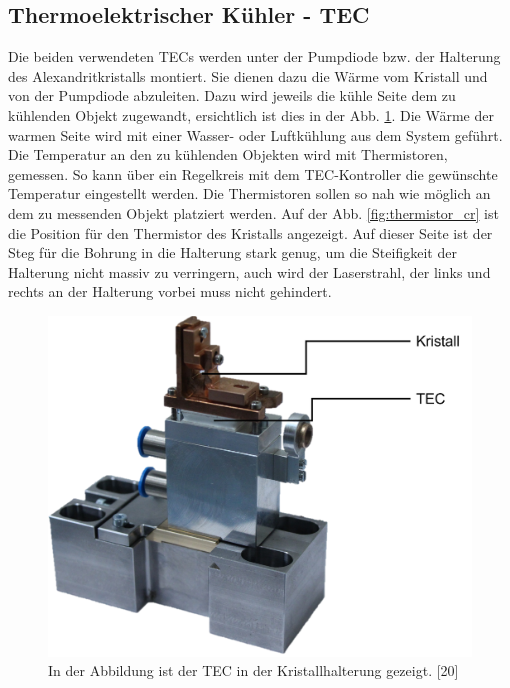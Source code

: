 \subsection{Thermoelektrischer Kühler - TEC}
Die beiden verwendeten TECs werden unter der Pumpdiode bzw. der Halterung des Alexandritkristalls montiert. Sie dienen dazu die Wärme vom Kristall und von der Pumpdiode abzuleiten. Dazu wird jeweils die kühle Seite dem zu kühlenden Objekt zugewandt, ersichtlich ist dies in der Abb. \ref{fig:tec_cr_hw}. Die Wärme der warmen Seite wird mit einer Wasser- oder Luftkühlung aus dem System geführt. Die Temperatur an den zu kühlenden Objekten wird mit Thermistoren, gemessen. So kann über ein Regelkreis mit dem TEC-Kontroller die gewünschte Temperatur eingestellt werden. Die Thermistoren sollen so nah wie möglich an dem zu messenden Objekt platziert werden. Auf der Abb. \ref{fig:thermistor_cr} ist die Position für den Thermistor des Kristalls angezeigt. Auf dieser Seite ist der Steg für die Bohrung in die Halterung stark genug, um die Steifigkeit der Halterung nicht massiv zu verringern, auch wird der Laserstrahl, der links und rechts an der Halterung vorbei muss nicht gehindert.

\begin{figure}[H]
    \centering
    \includegraphics[scale=0.5]{98_images/real_front_desc.png}
    \caption{In der Abbildung ist der TEC in der Kristallhalterung gezeigt. [20]}
    \label{fig:tec_cr_hw}
\end{figure}

